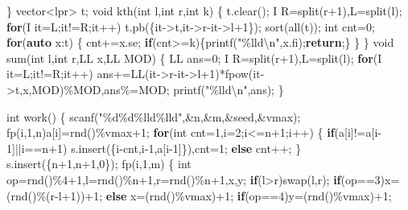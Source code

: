 \documentclass[
]{article}
\newenvironment{Shaded}{}{}
\newcommand{\ControlFlowTok}[1]{\textcolor[rgb]{0.00,0.44,0.13}{\textbf{#1}}}
\newcommand{\DataTypeTok}[1]{\textcolor[rgb]{0.56,0.13,0.00}{#1}}
\newcommand{\DecValTok}[1]{\textcolor[rgb]{0.25,0.63,0.44}{#1}}
\newcommand{\KeywordTok}[1]{\textcolor[rgb]{0.00,0.44,0.13}{\textbf{#1}}}
\newcommand{\NormalTok}[1]{#1}
\newcommand{\SpecialCharTok}[1]{\textcolor[rgb]{0.25,0.44,0.63}{#1}}
\newcommand{\StringTok}[1]{\textcolor[rgb]{0.25,0.44,0.63}{#1}}
\begin{document}
\begin{Shaded}
\begin{Highlighting}[]
\NormalTok{\}}
\NormalTok{vector\textless{}lpr\textgreater{} t;}
\DataTypeTok{void}\NormalTok{ kth(}\DataTypeTok{int}\NormalTok{ l,}\DataTypeTok{int}\NormalTok{ r,}\DataTypeTok{int}\NormalTok{ k)}
\NormalTok{\{}
\NormalTok{    t.clear();}
\NormalTok{    I R=split(r+}\DecValTok{1}\NormalTok{),L=split(l);}
    \ControlFlowTok{for}\NormalTok{(I it=L;it!=R;it++)}
\NormalTok{        t.pb(\{it{-}\textgreater{}t,it{-}\textgreater{}r{-}it{-}\textgreater{}l+}\DecValTok{1}\NormalTok{\});}
\NormalTok{    sort(all(t));}
    \DataTypeTok{int}\NormalTok{ cnt=}\DecValTok{0}\NormalTok{;}
    \ControlFlowTok{for}\NormalTok{(}\KeywordTok{auto}\NormalTok{ x:t)}
\NormalTok{    \{}
\NormalTok{        cnt+=x.se;}
        \ControlFlowTok{if}\NormalTok{(cnt\textgreater{}=k)\{printf(}\StringTok{"}\SpecialCharTok{\%lld\textbackslash{}n}\StringTok{"}\NormalTok{,x.fi);}\ControlFlowTok{return}\NormalTok{;\}}
\NormalTok{    \}}
\NormalTok{\}}
\DataTypeTok{void}\NormalTok{ sum(}\DataTypeTok{int}\NormalTok{ l,}\DataTypeTok{int}\NormalTok{ r,LL x,LL MOD)}
\NormalTok{\{}
\NormalTok{    LL ans=}\DecValTok{0}\NormalTok{;}
\NormalTok{    I R=split(r+}\DecValTok{1}\NormalTok{),L=split(l);}
    \ControlFlowTok{for}\NormalTok{(I it=L;it!=R;it++)}
\NormalTok{        ans+=LL(it{-}\textgreater{}r{-}it{-}\textgreater{}l+}\DecValTok{1}\NormalTok{)*fpow(it{-}\textgreater{}t,x,MOD)\%MOD,ans\%=MOD;}
\NormalTok{    printf(}\StringTok{"}\SpecialCharTok{\%lld\textbackslash{}n}\StringTok{"}\NormalTok{,ans);}
\NormalTok{\}}

\DataTypeTok{int}\NormalTok{ work()}
\NormalTok{\{}
\NormalTok{    scanf(}\StringTok{"}\SpecialCharTok{\%d\%d\%lld\%lld}\StringTok{"}\NormalTok{,\&n,\&m,\&seed,\&vmax);}
\NormalTok{    fp(i,}\DecValTok{1}\NormalTok{,n)a[i]=rnd()\%vmax+}\DecValTok{1}\NormalTok{;}
    \ControlFlowTok{for}\NormalTok{(}\DataTypeTok{int}\NormalTok{ cnt=}\DecValTok{1}\NormalTok{,i=}\DecValTok{2}\NormalTok{;i\textless{}=n+}\DecValTok{1}\NormalTok{;i++)}
\NormalTok{    \{}
        \ControlFlowTok{if}\NormalTok{(a[i]!=a[i{-}}\DecValTok{1}\NormalTok{]||i==n+}\DecValTok{1}\NormalTok{)}
\NormalTok{            s.insert(\{i{-}cnt,i{-}}\DecValTok{1}\NormalTok{,a[i{-}}\DecValTok{1}\NormalTok{]\}),cnt=}\DecValTok{1}\NormalTok{;}
        \ControlFlowTok{else}\NormalTok{ cnt++;}
\NormalTok{    \}}
\NormalTok{    s.insert(\{n+}\DecValTok{1}\NormalTok{,n+}\DecValTok{1}\NormalTok{,}\DecValTok{0}\NormalTok{\});}
\NormalTok{    fp(i,}\DecValTok{1}\NormalTok{,m)}
\NormalTok{    \{}
        \DataTypeTok{int}\NormalTok{ op=rnd()\%}\DecValTok{4}\NormalTok{+}\DecValTok{1}\NormalTok{,l=rnd()\%n+}\DecValTok{1}\NormalTok{,r=rnd()\%n+}\DecValTok{1}\NormalTok{,x,y;}
        \ControlFlowTok{if}\NormalTok{(l\textgreater{}r)swap(l,r);}
        \ControlFlowTok{if}\NormalTok{(op==}\DecValTok{3}\NormalTok{)x=(rnd()\%(r{-}l+}\DecValTok{1}\NormalTok{))+}\DecValTok{1}\NormalTok{;}
        \ControlFlowTok{else}\NormalTok{ x=(rnd()\%vmax)+}\DecValTok{1}\NormalTok{;}
        \ControlFlowTok{if}\NormalTok{(op==}\DecValTok{4}\NormalTok{)y=(rnd()\%vmax)+}\DecValTok{1}\NormalTok{;}
        

\end{Highlighting}
\end{Shaded}
\end{document}
